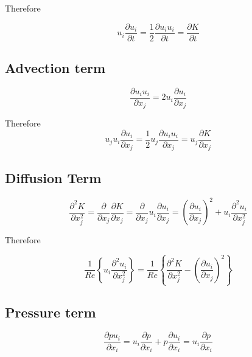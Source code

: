 \documentclass[11pt]{article}
\begin{document}
Therefore

\begin{equation}
	u_i \frac{\partial u_i}{\partial t}
	=
	\frac{1}{2} \frac{\partial u_i u_i}{\partial t}
	=
	\frac{\partial K}{\partial t}
\end{equation}

\subsection{Advection term}
\begin{equation}
	\frac{\partial u_i u_i}{\partial x_j}
	=
	2 u_i \frac{\partial u_i}{\partial x_j}
\end{equation}

Therefore
\begin{equation}
	u_j u_i \frac{\partial u_i}{\partial x_j}
	=
	\frac{1}{2} u_j \frac{\partial u_i u_i}{\partial x_j}
	=
	u_j \frac{\partial K}{\partial x_j}
\end{equation}


\subsection{Diffusion Term}

\begin{equation}
	\frac{\partial^2 K}{\partial x_j^2}
	=
	\frac{\partial}{\partial x_j}
	\frac{\partial K}{\partial x_j}
	=
	\frac{\partial}{\partial x_j}
	u_i
	\frac{\partial u_i}{\partial x_j}
	=
	\left( \frac{\partial u_i}{\partial x_j} \right)^2
	+
	u_i
	\frac{\partial^2 u_i}{\partial x_j^2}
\end{equation}

Therefore

\begin{equation}
	\frac{1}{Re}
	\left\{
	u_i
	\frac{\partial^2 u_i}{\partial x_j^2}
	\right\}
	=
	\frac{1}{Re}
	\left\{
	\frac{\partial^2 K}{\partial x_j^2}
	-
	\left( \frac{\partial u_i}{\partial x_j} \right)^2
	\right\}
\end{equation}


\subsection{Pressure term}
\begin{equation}
	\frac{\partial p u_i}{\partial x_i}
	=
	u_i \frac{\partial p}{\partial x_i}
	+
	p \frac{\partial u_i}{\partial x_i}
	=
	u_i \frac{\partial p}{\partial x_i}
\end{equation}
\end{document}
